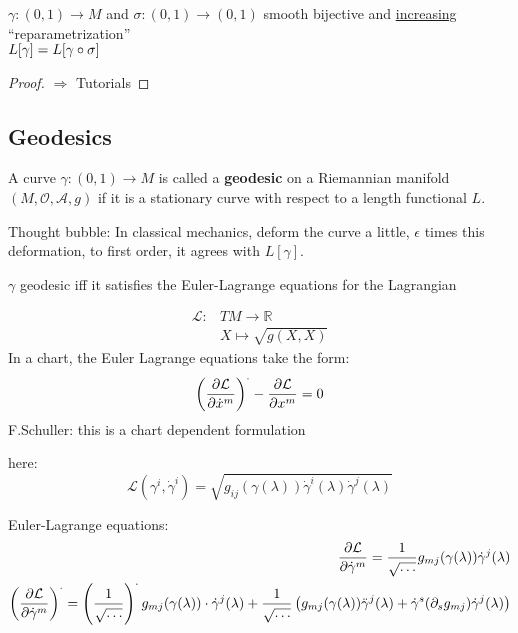 \begin{theorem}
$\gamma : (0,1) \to M$ and $\sigma :(0,1) \to (0,1)$ smooth bijective and \underline{increasing} ``reparametrization'' \\
$L[\gamma] = L[\gamma \after \sigma]$
\end{theorem}

\begin{proof}
  $\Longrightarrow $ Tutorials
\end{proof}

\subsection{Geodesics}
\begin{definition}
A curve $\gamma : (0,1) \to M$ is called a \textbf{geodesic} on a Riemannian manifold $(M, \mathcal{O}, \mathcal{A}, g)$ if it is a stationary curve with respect to a length functional $L$.
\end{definition}

Thought bubble: In classical mechanics, deform the curve a little, $\epsilon$ times this deformation, to first order, it agrees with $L[\gamma]$.

\begin{theorem}
$\gamma$ geodesic iff it satisfies the Euler-Lagrange equations for the Lagrangian
\end{theorem}

\begin{align*}
\mathcal{L} : & TM \to \mathbb{R} \\
& X \mapsto \sqrt{g(X,X)}
\end{align*}
In a chart, the Euler Lagrange equations take the form:
\[
\left(\cibasis[\mathcal{L}]{\dot{x}^m}\right)^{\cdot} - \cibasis[\mathcal{L}]{x^m} = 0 
\]
F.Schuller: this is a chart dependent formulation

here: 
\[
\mathcal{L}(\gamma^i, \dot{\gamma}^i) = \sqrt{g_{ij}(\gamma(\lambda)) \dot{\gamma}^i(\lambda) \dot{\gamma}^j(\lambda)}
\]

Euler-Lagrange equations:
\begin{align*}
\cibasis[\mathcal{L}]{\dot{\gamma}^m} = \frac{1}{\sqrt{\dots}} g_{mj}(\gamma(\lambda)) \dot{\gamma}^j(\lambda) \\
\left(\cibasis[\mathcal{L}]{\dot{\gamma}^m}\right)^{\cdot} = \left(\frac{1}{\sqrt{\dots}} \right)^{\cdot} g_{mj}(\gamma(\lambda)) \cdot \dot{\gamma}^j(\lambda) + \frac{1}{\sqrt{\dots}} \left(g_{mj}(\gamma(\lambda)) \ddot{\gamma}^j(\lambda) + \dot{\gamma}^s(\partial_s g_{mj}) \dot{\gamma}^j(\lambda) \right)
\end{align*}

